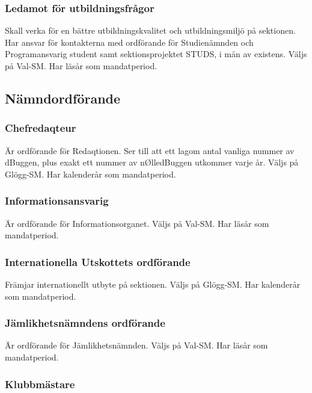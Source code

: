 \documentclass{dgovdoc}
\begin{document}
\subsubsection{Ledamot för utbildningsfrågor}

Skall verka för en bättre utbildningskvalitet och utbildningsmiljö på sektionen. Har ansvar för kontakterna med ordförande för Studienämnden och Programansvarig student samt sektionsprojektet STUDS, i mån av existens. Väljs på Val-SM. Har läsår som mandatperiod.

\subsection{Nämndordförande}

\subsubsection{Chefredaqteur}

Är ordförande för Redaqtionen. Ser till att ett lagom antal vanliga nummer av dBuggen, plus exakt ett nummer av nØlledBuggen utkommer varje år.
Väljs på Glögg-SM. Har kalenderår som mandatperiod.

\subsubsection{Informationsansvarig}

Är ordförande för Informationsorganet. Väljs på Val-SM. Har läsår som mandatperiod.

\subsubsection{Internationella Utskottets ordförande}

Främjar internationellt utbyte på sektionen.
Väljs på Glögg-SM. Har kalenderår som mandatperiod.

\subsubsection{Jämlikhetsnämndens ordförande}

Är ordförande för Jämlikhetsnämnden. Väljs på Val-SM. Har läsår som mandatperiod.

\subsubsection{Klubbmästare}
\end{document}
